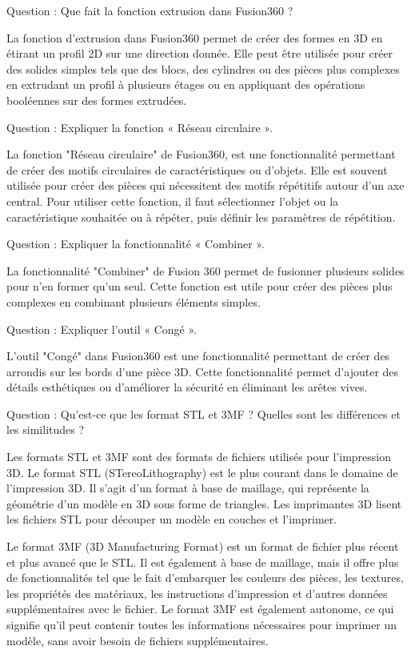 \documentclass[12pt, letterpaper]{report}
\begin{document}
Question : Que fait la fonction extrusion dans Fusion360 ?

La fonction d'extrusion dans Fusion360 permet de créer des formes en 3D en étirant un profil 2D sur une direction donnée. Elle peut être utilisée pour créer des solides simples tels que des blocs, des cylindres ou des pièces plus complexes en extrudant un profil à plusieurs étages ou en appliquant des opérations booléennes sur des formes extrudées.

Question : Expliquer la fonction « Réseau circulaire ».

La fonction "Réseau circulaire" de Fusion360,  est une fonctionnalité permettant de créer des motifs circulaires de caractéristiques ou d'objets. Elle est souvent utilisée pour créer des pièces qui nécessitent des motifs répétitifs autour d'un axe central. Pour utiliser cette fonction, il faut sélectionner l'objet ou la caractéristique souhaitée ou à répéter, puis définir les paramètres de répétition.

Question : Expliquer la fonctionnalité « Combiner ».

La fonctionnalité "Combiner" de Fusion 360 permet de fusionner plusieurs solides pour n'en former qu'un seul. Cette fonction est utile pour créer des pièces plus complexes en combinant plusieurs éléments simples.

Question : Expliquer l’outil « Congé ».

L'outil "Congé" dans Fusion360 est une fonctionnalité permettant de créer des arrondis sur les bords d'une pièce 3D. Cette fonctionnalité permet d'ajouter des détails esthétiques ou d'améliorer la sécurité en éliminant les arêtes vives.

Question : Qu’est-ce que les format STL et 3MF ? Quelles sont les différences et les similitudes ?

Les formats STL et 3MF sont des formats de fichiers utilisés pour l'impression 3D. Le format STL (STereoLithography) est le plus courant dans le domaine de l'impression 3D. Il s'agit d'un format à base de maillage, qui représente la géométrie d'un modèle en 3D sous forme de triangles. Les imprimantes 3D lisent les fichiers STL pour découper un modèle en couches et l'imprimer.

Le format 3MF (3D Manufacturing Format) est un format de fichier plus récent et plus avancé que le STL. Il est également à base de maillage, mais il offre plus de fonctionnalités tel que le fait d'embarquer les couleurs des pièces, les textures, les propriétés des matériaux, les instructions d'impression et d'autres données supplémentaires avec le fichier. Le format 3MF est également autonome, ce qui signifie qu'il peut contenir toutes les informations nécessaires pour imprimer un modèle, sans avoir besoin de fichiers supplémentaires.
\end{document}
